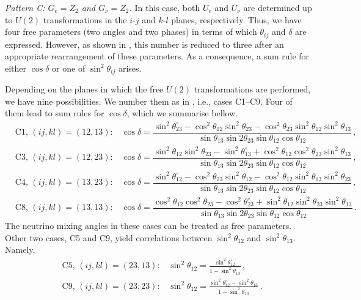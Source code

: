 \documentclass[11pt,a4paper]{article}
\def\th{\theta}
\numberwithin{equation}{section}
\begin{document}
 \textit{Pattern C: $G_e = Z_2$ and $G_{\nu} = Z_2$.} 
In this case, both $U_e$ and $U_\nu$ are determined up to $U(2)$ 
transformations in the $i$-$j$ and $k$-$l$ planes, respectively.
Thus, we have four free parameters (two angles and two phases) 
in terms of which $\th_{ij}$ and $\delta$ are expressed.
However, as shown in \cite{Girardi:2015rwa},
this number is reduced to three after
an appropriate rearrangement of these parameters.
As a consequence, a sum rule for either $\cos\delta$ or one of 
$\sin^2\th_{ij}$ arises.

 Depending on the planes in which the free $U(2)$ transformations 
are performed, we have nine possibilities. 
We number them as in \cite{Girardi:2015rwa}, i.e., cases C1--C9.
Four of them lead to sum rules for $\cos\delta$, which we summarise bellow.
\begin{align}
&\text{C1, $(ij,kl) = (12,13)$:} \quad
\cos \delta = 
\dfrac{\sin^2 \theta^{\circ}_{23} - \cos^2 \theta_{12} \sin^2 \theta_{23} - \cos^2 \theta_{23} \sin^2 \theta_{12} \sin^2 \theta_{13}}
{\sin \theta_{13} \sin 2 \theta_{23} \sin \theta_{12} \cos \theta_{12}}\,, 
\label{eq:cosdeltaC1}\\[0.2cm]
&\text{C3, $(ij,kl) = (12,23)$:} \quad
\cos \delta = 
\dfrac{\sin^2 \theta_{12} \sin^2 \theta_{23} - \sin^2 \theta^{\circ}_{13} + \cos^2 \theta_{12} \cos^2 \theta_{23} \sin^2 \theta_{13}}
{\sin \theta_{13} \sin 2 \theta_{23} \sin \theta_{12} \cos \theta_{12}}\,, \\[0.2cm]
&\text{C4, $(ij,kl) = (13,23)$:} \quad 
\cos \delta = 
\dfrac{\sin^2 \theta^{\circ}_{12} - \cos^2 \theta_{23} \sin^2 \theta_{12} - \cos^2 \theta_{12} \sin^2 \theta_{13} \sin^2 \theta_{23}}
{\sin \theta_{13} \sin 2 \theta_{23} \sin \theta_{12} \cos \theta_{12}}\,, \\[0.2cm]
&\text{C8, $(ij,kl) = (13,13)$:} \quad 
\cos \delta = 
\dfrac{\cos^2 \theta_{12} \cos^2 \theta_{23} - \cos^2 \theta^{\circ}_{23} + 
\sin^2 \theta_{12} \sin^2 \theta_{23} \sin^2 \theta_{13}}
{\sin \theta_{13} \sin 2 \theta_{23} \sin \theta_{12} \cos \theta_{12}}\,.
\label{eq:cosdeltaC8}
\end{align}
%
The neutrino mixing angles in these cases can be treated as free parameters. 
Other two cases, C5 and C9, yield correlations between 
$\sin^2\th_{12}$ and $\sin^2\th_{13}$. Namely, 
\begin{align}
&\text{C5, $(ij,kl) = (23,13)$:} \quad 
\sin^2 \theta_{12} = \frac{\sin^2 \theta^{\circ}_{12}}{1 - \sin^2 \theta_{13}}\,, \\[0.2cm]
&\text{C9, $(ij,kl) = (23,23)$:} \quad
\sin^2 \theta_{12} = \frac{\sin^2 \theta^\circ_{12} - \sin^2 \theta_{13}}{1 - \sin^2 \theta_{13}}\,.
\label{eq:ss12C9}
\end{align}
\end{document}
